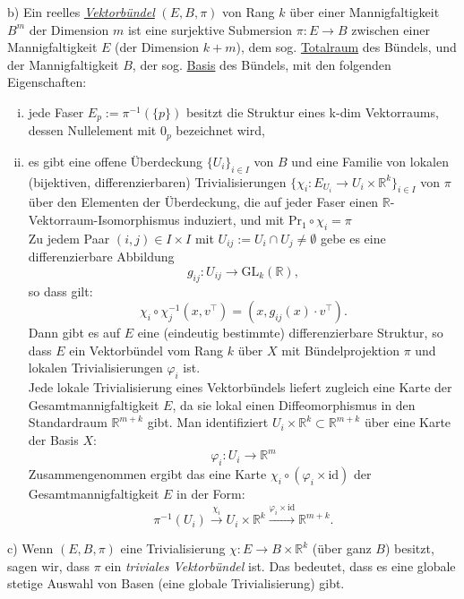 \documentclass[fleqn, 12pt, letterpaper]{article}
\begin{document}
b) Ein reelles \emph{\underline{Vektorbündel}} \((E, B, \pi)\) von Rang \(k\) über einer Mannigfaltigkeit \(B^m\) der Dimension \(m\) ist eine surjektive Submersion \(\pi:E\longrightarrow B\) zwischen einer Mannigfaltigkeit \(E\) (der Dimension $k+m$), dem sog. \underline{Totalraum} des Bündels, und der Mannigfaltigkeit \(B\), der sog. \underline{Basis} des Bündels, mit den folgenden Eigenschaften:
\begin{enumerate}[i)]
    \item jede Faser \(E_p := \pi^{-1}(\{p\})\) besitzt die Struktur eines k-dim Vektorraums, dessen Nullelement mit \(0_p\) bezeichnet wird,
    
    \item es gibt eine offene Überdeckung \(\{U_i\}_{i \in I}\) von \(B\) und eine Familie von lokalen (bijektiven, differenzierbaren) Trivialisierungen \(\{\chi_i:E_{U_i}\longrightarrow U_i\times\mathbb{R}^k\}_{i\in I}\) von \(\pi\) über den Elementen der Überdeckung, die auf jeder Faser einen $\mathbb{R}$-Vektorraum-Isomorphismus induziert, und mit $\mathrm{Pr}_1 \circ \chi_i = \pi$ \\
    
    Zu jedem Paar $(i, j) \in I \times I$ mit $U_{ij} := U_i \cap U_j \neq \emptyset$ gebe es
eine differenzierbare Abbildung
\[
g_{ij} : U_{ij} \to \mathrm{GL}_k(\mathbb{R}),
\]
so dass gilt:
\[
\chi_i \circ \chi_j^{-1}(x, v^\top) = (x, g_{ij}(x) \cdot v^\top).
\]
Dann gibt es auf $E$ eine (eindeutig bestimmte) differenzierbare Struktur, so dass
$E$ ein Vektorbündel vom Rang $k$ über $X$ mit Bündelprojektion $\pi$ und lokalen
Trivialisierungen $\varphi_i$ ist.\\

Jede lokale Trivialisierung eines Vektorbündels liefert zugleich eine Karte der Gesamtmannigfaltigkeit $E$, da sie lokal einen Diffeomorphismus in den Standardraum $\mathbb{R}^{m+k}$ gibt. Man identifiziert $U_i \times \mathbb{R}^k \subset \mathbb{R}^{m+k}$ über eine Karte der Basis $X$:
\[
\varphi_i: U_i \to \mathbb{R}^m
\]
Zusammengenommen ergibt das eine Karte $\chi_i \circ (\varphi_i \times \mathrm{id})$ der Gesamtmannigfaltigkeit $E$ in der Form:
\[
\pi^{-1}(U_i) \xrightarrow{\chi_i} U_i \times \mathbb{R}^k 
\xrightarrow{\varphi_i \times \mathrm{id}} \mathbb{R}^{m+k}.
\]


\end{enumerate}

\vspace{1em}

c) Wenn \((E,B,\pi)\) eine Trivialisierung \(\chi: E \to B \times\mathbb{R}^k\) (über ganz \(B\)) besitzt, sagen wir, dass \(\pi\) ein \emph{triviales Vektorbündel} ist. Das bedeutet, dass es eine globale stetige Auswahl von Basen (eine globale Trivialisierung) gibt.
\end{document}
